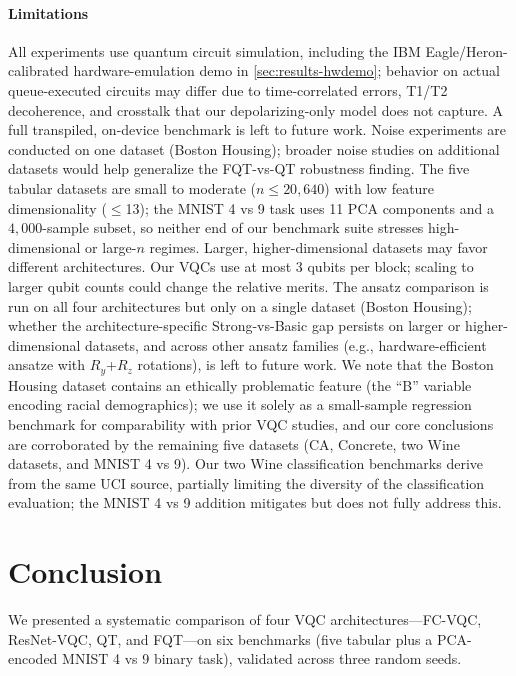 \documentclass[10pt,conference]{IEEEtran}
\begin{document}
\paragraph{Limitations}
All experiments use quantum circuit simulation, including the IBM Eagle/Heron-calibrated hardware-emulation demo in \cref{sec:results-hwdemo}; behavior on actual queue-executed circuits may differ due to time-correlated errors, T1/T2 decoherence, and crosstalk that our depolarizing-only model does not capture.
A full transpiled, on-device benchmark is left to future work.
Noise experiments are conducted on one dataset (Boston Housing); broader noise studies on additional datasets would help generalize the FQT-vs-QT robustness finding.
The five tabular datasets are small to moderate ($n \leq 20{,}640$) with low feature dimensionality (${\leq}$13); the MNIST 4 vs 9 task uses 11 PCA components and a $4{,}000$-sample subset, so neither end of our benchmark suite stresses high-dimensional or large-$n$ regimes.
Larger, higher-dimensional datasets may favor different architectures.
Our VQCs use at most 3 qubits per block; scaling to larger qubit counts could change the relative merits.
The ansatz comparison is run on all four architectures but only on a single dataset (Boston Housing); whether the architecture-specific Strong-vs-Basic gap persists on larger or higher-dimensional datasets, and across other ansatz families (e.g., hardware-efficient ansatze with $R_y$+$R_z$ rotations), is left to future work.
We note that the Boston Housing dataset contains an ethically problematic feature (the ``B'' variable encoding racial demographics); we use it solely as a small-sample regression benchmark for comparability with prior VQC studies, and our core conclusions are corroborated by the remaining five datasets (CA, Concrete, two Wine datasets, and MNIST 4 vs 9).
Our two Wine classification benchmarks derive from the same UCI source, partially limiting the diversity of the classification evaluation; the MNIST 4 vs 9 addition mitigates but does not fully address this.

\section{Conclusion}
\label{sec:conclusion}

We presented a systematic comparison of four VQC architectures---FC-VQC, ResNet-VQC, QT, and FQT---on six benchmarks (five tabular plus a PCA-encoded MNIST 4 vs 9 binary task), validated across three random seeds.
\end{document}
